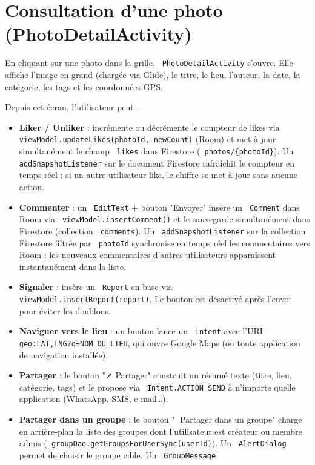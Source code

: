 \documentclass[a4paper,12pt,openany]{report}
\newcommand{\ic}[1]{\texttt{\small\colorbox{lightbg}{\color{navy!90} #1}}}
\begin{document}
\section{Consultation d'une photo (PhotoDetailActivity)}

En cliquant sur une photo dans la grille, \ic{PhotoDetailActivity} s'ouvre.
Elle affiche l'image en grand (chargée via Glide), le titre, le lieu, l'auteur,
la date, la catégorie, les tags et les coordonnées GPS.

Depuis cet écran, l'utilisateur peut :
\begin{itemize}
  \item \textbf{Liker / Unliker} : incrémente ou décrémente le compteur de likes
    via \ic{viewModel.updateLikes(photoId, newCount)} (Room) et met à jour
    simultanément le champ \ic{likes} dans Firestore (\ic{photos/\{photoId\}}).
    Un \ic{addSnapshotListener} sur le document Firestore rafraîchit le compteur
    en temps réel : si un autre utilisateur like, le chiffre se met à jour sans
    aucune action.
  \item \textbf{Commenter} : un \ic{EditText} + bouton "Envoyer" insère un
    \ic{Comment} dans Room via \ic{viewModel.insertComment()} et le sauvegarde
    simultanément dans Firestore (collection \ic{comments}). Un
    \ic{addSnapshotListener} sur la collection Firestore filtrée par \ic{photoId}
    synchronise en temps réel les commentaires vers Room : les nouveaux commentaires
    d'autres utilisateurs apparaissent instantanément dans la liste.
  \item \textbf{Signaler} : insère un \ic{Report} en base via
    \ic{viewModel.insertReport(report)}. Le bouton est désactivé après
    l'envoi pour éviter les doublons.
  \item \textbf{Naviguer vers le lieu} : un bouton lance un \ic{Intent} avec
    l'URI \ic{geo:LAT,LNG?q=NOM\_DU\_LIEU}, qui ouvre Google Maps (ou toute
    application de navigation installée).
  \item \textbf{Partager} : le bouton "↗ Partager" construit un résumé texte
    (titre, lieu, catégorie, tags) et le propose via \ic{Intent.ACTION\_SEND}
    à n'importe quelle application (WhatsApp, SMS, e-mail…).
  \item \textbf{Partager dans un groupe} : le bouton "👥 Partager dans un groupe"
    charge en arrière-plan la liste des groupes dont l'utilisateur est créateur
    ou membre admis (\ic{groupDao.getGroupsForUserSync(userId)}). Un
    \ic{AlertDialog} permet de choisir le groupe cible. Un \ic{GroupMessage}

\end{itemize}
\end{document}
